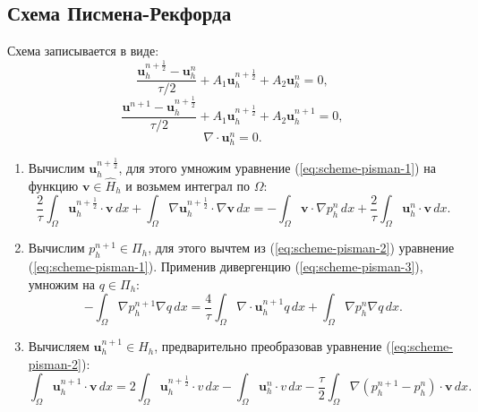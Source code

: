 \documentclass[12pt]{article}
\begin{document}
\subsection{Схема Писмена-Рекфорда} 
Схема записывается в виде:
\begin{equation} \label{eq:scheme-pisman-1}
\frac{{\bm u}_h^{n+\frac{1}{2}}-{\bm u}_h^n}{\tau/2} + A_1 {\bm u}_h^{n+\frac{1}{2}}+A_2 {\bm u}_h^n=0,
\end{equation}
\begin{equation} \label{eq:scheme-pisman-2}
\frac{{\bm u}^{n+1}-{\bm u}_h^{n+\frac{1}{2}}}{\tau/2} + A_1 {\bm u}_h^{n+\frac{1}{2}}+ A_2 {\bm u}_h^{n+1}=0,
\end{equation}
\begin{equation} \label{eq:scheme-pisman-3}
\nabla \cdot {\bm u}_h^n = 0.
\end{equation}
\begin{enumerate}
\item 
Вычислим ${\bm u}_h^{n+\frac{1}{2}}$, для этого умножим уравнение (\ref{eq:scheme-pisman-1}) на функцию ${\bm v} \in \hat H_h$ и возьмем интеграл по $\Omega$:
$$
\frac{2}{\tau}\int_{\Omega} {\bm u}_h^{n+\frac{1}{2}}\cdot {\bm v} \,dx + \int_{\Omega} \nabla {\bm u}_h^{n+\frac{1}{2}} \cdot \nabla {\bm v} \,dx = -\int_{\Omega} {\bm v} \cdot \nabla p_h^{n}\, dx + \frac{2}{\tau} \int_{\Omega} {\bm u}_h^{n} \cdot {\bm v} \,dx.
$$
\item 
Вычислим $p_h^{n+1} \in \Pi_h$, для этого вычтем из (\ref{eq:scheme-pisman-2}) уравнение (\ref{eq:scheme-pisman-1}). Применив дивергенцию (\ref{eq:scheme-pisman-3}), умножим на $q \in \Pi_h$:
$$
-\int_{\Omega} \nabla p_h^{n+1} \nabla q \,dx = \frac{4}{\tau} \int_{\Omega} \nabla \cdot {\bm u}_h^{n+1} q \,dx + \int_{\Omega} \nabla p_h^{n} \nabla q \,dx.
$$
\item 
Вычисляем ${\bm u}_h^{n+1} \in H_h$, предварительно преобразовав уравнение (\ref{eq:scheme-pisman-2}):
$$
\int_{\Omega} {\bm u}_h^{n+1} \cdot {\bm v}\,dx =  2 \int_{\Omega} {\bm u}_h^{n+\frac{1}{2}} \cdot v \,dx - \int_{\Omega} {\bm u}_h^n \cdot v \,dx - \frac{\tau}{2} \int_{\Omega} \nabla (p_h^{n+1} - p_h^n) \cdot {\bm v} \,dx.
$$
\end{enumerate}
\end{document}
